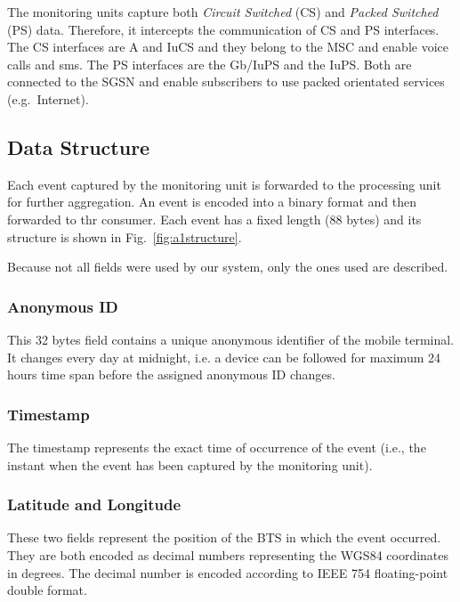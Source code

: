 \documentclass[master,english]{hgbthesis}
\begin{document}
The monitoring units capture both \emph{Circuit Switched} (CS) and \emph{Packed Switched} (PS) data. Therefore, it intercepts the communication of CS and PS interfaces. The CS interfaces are A and IuCS and they belong to the MSC and enable voice calls and sms. The PS interfaces are the Gb/IuPS and the IuPS. Both are connected to the SGSN and enable subscribers to use packed orientated services (e.g.\ Internet).



\subsection{Data Structure}

\label{sec:dataa1}

Each event captured by the monitoring unit is forwarded to the processing unit for further aggregation. An event is encoded into a binary format and then forwarded to thr consumer. Each event has a fixed length (88 bytes) and its structure is shown in Fig.~\ref{fig:a1structure}.

Because not all fields were used by our system, only the ones used are described.

\subsubsection{Anonymous ID}

\label{sec:anonymous}

This 32 bytes field contains a unique anonymous identifier of the mobile terminal. It changes every day at midnight, i.e. a device can be followed for maximum 24 hours time span before the assigned anonymous ID changes.

\subsubsection{Timestamp} The timestamp represents the exact time of occurrence of the event (i.e., the instant when the event has been captured by the monitoring unit).

\subsubsection{Latitude and Longitude}

These two fields represent the position of the BTS in which the event occurred. They are both encoded as decimal numbers representing the WGS84 coordinates in degrees. The decimal number is encoded according to IEEE 754 floating-point double format\cite{IEEE754}.
\end{document}
